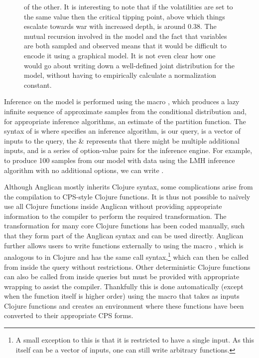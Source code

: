 \begin{figure}[t]
{of the other.  It is interesting to note that if the volatilities are set to the same value then
the critical tipping point, above which things escalate towards war with increased depth, is around $0.38$.
The mutual recursion involved in the model and the fact that variables are both sampled and 
observed means that it would be difficult to encode it using a graphical model.  It is not even clear how
one would go about writing down a well-defined joint distribution for the model, without having to empirically
calculate a normalization constant.
\label{fig:probprog:schell}
		}
\end{figure}

Inference on the model is performed using the macro \doquery, which produces a lazy infinite sequence of 
approximate samples from the conditional distribution and, for appropriate inference algorithms,
an estimate of the partition function.
The syntax of \doquery is {\small {}} where {\small {}}
specifies an inference algorithm, {\small {}} is our query, {\small {}}
is a vector of inputs to the query, the \& represents that there might be multiple additional inputs, and {\small {}}
is a series of option-value pairs for the inference engine.  For example, to produce 100 samples from
our {\small {}} model with data {\small \lsi{[2.1 5.2 1.1]}} using the LMH inference algorithm with no
additional options, we can write {\small {}}.

Although Anglican mostly inherits Clojure syntax, some complications arise from the compilation to
CPS-style Clojure functions.  It is thus not possible to na\"{i}vely use all Clojure functions inside Anglican
without providing appropriate information to the compiler to perform the required transformation.
The transformation for many core Clojure functions has been coded manually, such that they form
part of the Anglican syntax and can be used directly.  Anglican further allows users to write functions externally
to  using the macro , which is analogous to  in Clojure and has the same call syntax,\footnote{A small
	exception to this is that it is restricted to have a single input.  As this itself can be a vector of inputs, one
	can still write arbitrary functions.}
which can then be called from inside the query without restrictions.  Other deterministic Clojure functions can also
be called from inside queries but must be provided with appropriate wrapping to assist the compiler.  Thankfully
this is done automatically (except when the function itself is higher order) using the macro
{\small {}} that takes as inputs Clojure functions and creates an environment where
these functions have been converted to their appropriate CPS forms.

